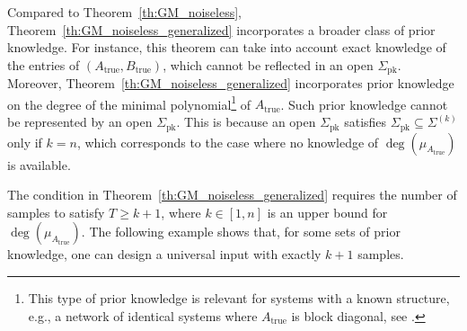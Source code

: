 \documentclass[journal,twoside,web]{ieeecolor}
\begin{document}
Compared to Theorem~\ref{th:GM_noiseless}, Theorem~\ref{th:GM_noiseless_generalized} incorporates a broader class of prior knowledge. For instance, this theorem can take into account exact knowledge of the entries of $(A_\text{true},B_\text{true})$, which cannot be reflected in an open $\Sigma_\text{pk}$. Moreover, Theorem~\ref{th:GM_noiseless_generalized} incorporates prior knowledge on the degree of the minimal polynomial\footnote{This type of prior knowledge is relevant for systems with a known structure, e.g., a network of identical systems where $A_\text{true}$ is block diagonal, see \cite[Cor. 2]{yu2021controllability}.} of $A_\text{true}$. Such prior knowledge cannot be represented by an open $\Sigma_\text{pk}$. This is because an open $\Sigma_\text{pk}$ satisfies $\Sigma_\text{pk}\subseteq\Sigma^{(k)}$ only if $k=n$, which corresponds to the case where no knowledge of $\deg(\mu_{A_\text{true}})$ is available. 

The condition in Theorem~\ref{th:GM_noiseless_generalized} requires the number of samples to satisfy $T\geq k+1$, where $k\in[1,n]$ is an upper bound for $\deg(\mu_{A_\text{true}})$. The following example shows that, for some sets of prior knowledge, one can design a universal input with exactly $k+1$ samples.
\end{document}

